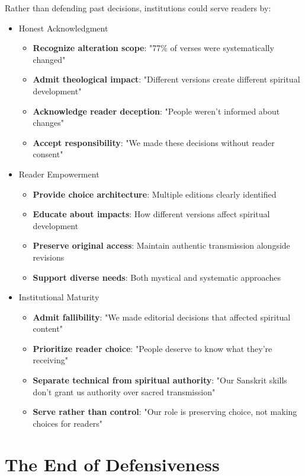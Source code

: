 \documentclass[11pt,twoside]{book}
\begin{document}
Rather than defending past decisions, institutions could serve readers by:
\begin{itemize}
\item Honest Acknowledgment
\label{sec:orgf9d72e4}
\begin{itemize}
\item \textbf{\textbf{Recognize alteration scope}}: "77\% of verses were systematically changed"
\item \textbf{\textbf{Admit theological impact}}: "Different versions create different spiritual development"
\item \textbf{\textbf{Acknowledge reader deception}}: "People weren't informed about changes"
\item \textbf{\textbf{Accept responsibility}}: "We made these decisions without reader consent"
\end{itemize}
\item Reader Empowerment
\label{sec:org8d51aa9}
\begin{itemize}
\item \textbf{\textbf{Provide choice architecture}}: Multiple editions clearly identified
\item \textbf{\textbf{Educate about impacts}}: How different versions affect spiritual development
\item \textbf{\textbf{Preserve original access}}: Maintain authentic transmission alongside revisions
\item \textbf{\textbf{Support diverse needs}}: Both mystical and systematic approaches
\end{itemize}
\item Institutional Maturity
\label{sec:org9637dca}
\begin{itemize}
\item \textbf{\textbf{Admit fallibility}}: "We made editorial decisions that affected spiritual content"
\item \textbf{\textbf{Prioritize reader choice}}: "People deserve to know what they're receiving"
\item \textbf{\textbf{Separate technical from spiritual authority}}: "Our Sanskrit skills don't grant us authority over sacred transmission"
\item \textbf{\textbf{Serve rather than control}}: "Our role is preserving choice, not making choices for readers"
\end{itemize}
\end{itemize}
\section*{The End of Defensiveness}
\label{sec:orge266f02}
\end{document}
